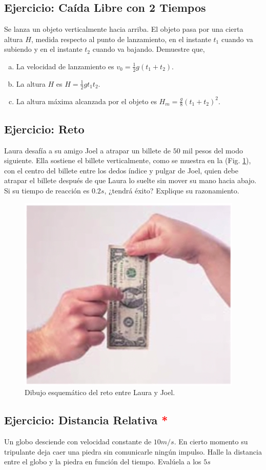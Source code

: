 \documentclass{replab}
\begin{document}
	\subsection{Ejercicio: Caída Libre con 2 Tiempos}
	Se lanza un objeto verticalmente hacia arriba. El objeto pasa por una cierta altura $H$, medida respecto al punto de lanzamiento, en el instante $t_1$ cuando va subiendo y en el instante $t_2$ cuando va bajando. Demuestre que,

	\begin{enumerate}[a)]
		\item La velocidad de lanzamiento es $v_0 = \frac{1}{2}g(t_1 + t_2)$.
		\item La altura $H$ es $H = \frac{1}{2}gt_1t_2$.
		\item La altura máxima alcanzada por el objeto es $H_{m} = \frac{g}{8}(t_1 + t_2)^2$. 
	\end{enumerate}

	\subsection{Ejercicio: Reto}
	Laura desafía a su amigo Joel a atrapar un billete de $50$ mil pesos del modo siguiente. Ella sostiene el billete verticalmente, como se muestra en la (Fig. \ref{fig:reto}), con el centro del billete entre los dedos índice y pulgar de Joel, quien debe atrapar el billete después de que Laura lo suelte sin mover su mano hacia abajo. Si su tiempo de reacción es $0.2s$, ¿tendrá éxito? Explique su razonamiento.

	\begin{figure}[htbp]
		\centering
		\includegraphics[width=.3\columnwidth]{imagenes/reto.png}
		\caption{Dibujo esquemático del reto entre Laura y Joel.}
		\label{fig:reto}
	\end{figure}

	\subsection{Ejercicio: Distancia Relativa \textcolor{red}{*}}
	Un globo desciende con velocidad constante de $10m/s$. En cierto momento su tripulante deja caer una piedra sin comunicarle ningún impulso. Halle la distancia entre el globo y la piedra en función del tiempo. Evalúela a los $5s$
\end{document}
